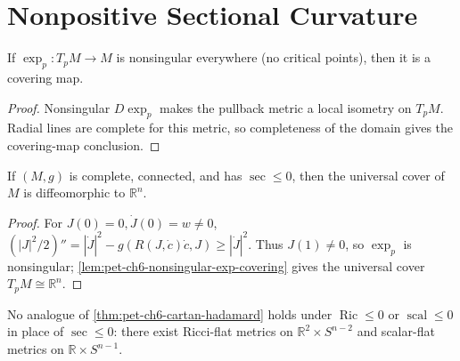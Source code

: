 \section{Nonpositive Sectional Curvature}

\begin{lemma}
  \label{lem:pet-ch6-nonsingular-exp-covering}
  If $\exp_p:T_pM\to M$ is nonsingular everywhere (no critical points), then it
  is a covering map.
\end{lemma}
\begin{proof}
  \sketch
  Nonsingular \(D\exp_p\) makes the pullback metric a local isometry on \(T_pM\). Radial lines are complete for this metric, so completeness of the domain gives the covering-map conclusion.
\end{proof}

\begin{theorem}
  \label{thm:pet-ch6-cartan-hadamard}
  If $(M,g)$ is complete, connected, and has $\sec\le0$, then the universal
  cover of $M$ is diffeomorphic to $\mathbb{R}^n$.
\end{theorem}
\begin{proof}
  \sketch
  For \(J(0)=0,\dot J(0)=w\ne0\), \((|J|^2/2)''=|\dot J|^2-g(R(J,\dot c)\dot c,J)\ge|\dot J|^2\). Thus \(J(1)\ne0\), so \(\exp_p\) is nonsingular; \cref{lem:pet-ch6-nonsingular-exp-covering} gives the universal cover \(T_pM\cong\mathbb R^n\).
\end{proof}

\begin{remark}
  \label{rem:pet-ch6-cartan-hadamard-fails-ricci}
  No analogue of \cref{thm:pet-ch6-cartan-hadamard} holds under $\operatorname{Ric}\le0$
  or $\operatorname{scal}\le0$ in place of $\sec\le0$: there exist Ricci-flat metrics on
  $\mathbb{R}^2\times S^{n-2}$ and scalar-flat metrics on $\mathbb{R}\times S^{n-1}$.
\end{remark}

